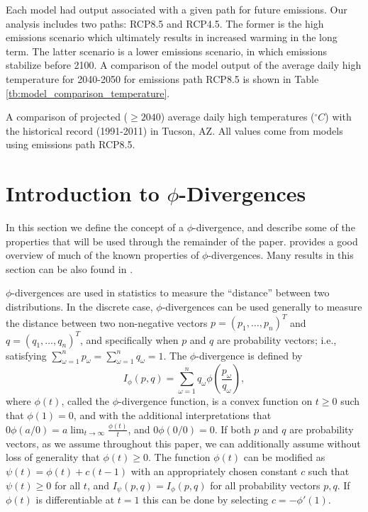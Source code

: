 \documentclass[opre,nonblindrev]{informs3} %
\begin{document}
Each model had output associated with a given path for future emissions.
Our analysis includes two paths: RCP8.5 and RCP4.5.
The former is the high emissions scenario which ultimately results in increased warming in the long term.
The latter scenario is a lower emissions scenario, in which emissions stabilize before 2100.
A comparison of the model output of the average daily high temperature for 2040-2050 for emissions path RCP8.5 is shown in Table \ref{tb:model_comparison_temperature}.

\begin{table}
	\TABLE
	{
		A comparison of projected ($\geq 2040$) average daily high temperatures ($^\circ C$) with the historical record (1991-2011) in Tucson, AZ.
		All values come from models using emissions path RCP8.5.
		\label{tb:model_comparison_temperature}
	}
	{}
	{}
\end{table}

\section{Introduction to $\phi$-Divergences}
\label{sec:phi_divergences}

In this section we define the concept of a $\phi$-divergence, and describe some of the properties that will be used through the remainder of the paper.
\cite{pardo2005statistical} provides a good overview of much of the known properties of $\phi$-divergences.
Many results in this section can be also found in \citep{bental2011robust}.

$\phi$-divergences are used in statistics to measure the ``distance'' between two distributions. 
In the discrete case, $\phi$-divergences can be used generally to measure the distance between two non-negative vectors $p = (p_1, \dots, p_n)^T$ and $q = (q_1, \dots, q_n)^T$, and specifically when $p$ and $q$ are probability vectors; i.e., satisfying $\sum_{\omega=1}^n p_\omega = \sum_{\omega=1}^n q_\omega = 1$.
The $\phi$-divergence is defined by
\[
	I_\phi(p,q) = \sum_{\omega=1}^n q_\omega \phi\left(\frac{p_\omega}{q_\omega}\right),
\]
where $\phi(t)$, called the $\phi$-divergence function, is a convex function on $t \geq 0$ such that $\phi(1) = 0$, and with the additional interpretations that $0 \phi(a/0) = a \lim_{t \rightarrow \infty} \frac{\phi(t)}{t}$, and $0 \phi(0/0) = 0$.
If both $p$ and $q$ are probability vectors, as we assume throughout this paper, we can additionally assume without loss of generality that $\phi(t) \geq 0$.
The function $\phi(t)$ can be modified as $\psi(t) = \phi(t) + c(t-1)$ with an appropriately chosen constant $c$ such that $\psi(t) \geq 0$ for all $t$, and $I_\psi(p,q) = I_\phi(p,q)$ for all probability vectors $p,q$.
If $\phi(t)$ is differentiable at $t = 1$ this can be done by selecting $c = -\phi'(1)$.
\end{document}
